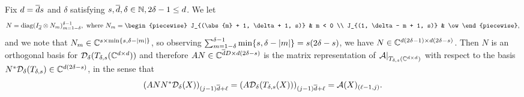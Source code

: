 \begin{proposition} \label{prop:zero_cols}
  Fix $d = \overline{d} s$ and $\delta$ satisfying $s, \overline{d}, \delta \in \mathbb{N}, 2 \delta - 1 \le d$.  We let
  \begin{equation}
    N = \diag(I_{\dbar} \otimes N_m)_{m = 1 - \delta}^{\delta - 1},\ \text{where} \ 
    N_m = \begin{piecewise}
      J_{(\abs{m} + 1, \delta + 1, s)} & m < 0 \\
      J_{(1, \delta - m + 1, s)} & \ow
    \end{piecewise}
    , \label{eq:N_and_N_m}
  \end{equation}
  and we note that $N_m \in \mathbb{C}^{s \times \min\{s, \delta - \lvert m\rvert\}}$, so observing $\sum_{m = 1 - \delta}^{\delta - 1} \min\{s, \delta - \lvert m\rvert\} = s (2 \delta - s)$, we have $N \in \mathbb{C}^{d (2 \delta - 1) \times d (2 \delta - s)}$.  Then $N$ is an orthogonal basis for $\mathcal{D}_\delta(T_{\delta, s}(\mathbb{C}^{d \times d}))$ and therefore $A N \in \mathbb{C}^{\overline{d} D \times d (2 \delta - s)}$ is the matrix representation of $\left.\mathcal{A}\right|_{T_{\delta, s}(\mathbb{C}^{d \times d})}$ with respect to the basis $N^* \mathcal{D}_\delta(T_{\delta, s}) \in \mathbb{C}^{d (2 \delta - s)}$, in the sense that \[(A N N^* \mathcal{D}_\delta(X))_{(j - 1) \overline{d} + \ell} = (A \mathcal{D}_\delta(T_{\delta, s}(X)))_{(j - 1) \overline{d} + \ell} = \mathcal{A}(X)_{(\ell - 1, j)}.\]
\end{proposition}
